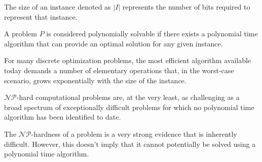 \begin{definition}
    The size of an instance denoted as $\left\lvert I \right\rvert$ represents the number of bits required to represent that instance.
\end{definition}
\begin{definition}
    A problem $P$ is considered polynomially solvable if there exists a polynomial time algorithm that can provide an optimal solution for any given instance.
\end{definition}
For many discrete optimization problems, the most efficient algorithm available today demands a number of elementary operations that, in the worst-case scenario, grows exponentially with the size of the instance.
\begin{definition}
    $\mathcal{NP}$-hard computational problems are, at the very least, as challenging as a broad spectrum of exceptionally difficult problems for which no polynomial time algorithm has been identified to date.
\end{definition}
The $\mathcal{N}\mathcal{P}$-hardness of a problem is a very strong evidence that is inherently difficult. 
However, this doesn't imply that it cannot potentially be solved using a polynomial time algorithm.